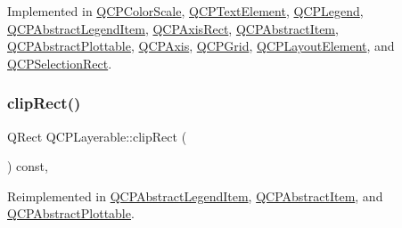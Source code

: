 Implemented in \hyperlink{class_q_c_p_color_scale_af1b24d24a70f25b65d29f09e413390a8}{Q\+C\+P\+Color\+Scale}, \hyperlink{class_q_c_p_text_element_a91f2e4b4a639d9079e89a0030c7ed352}{Q\+C\+P\+Text\+Element}, \hyperlink{class_q_c_p_legend_a817f75c234f82a2e26643dc0de742095}{Q\+C\+P\+Legend}, \hyperlink{class_q_c_p_abstract_legend_item_a6bfbcb9ace779f4f6fe22241c32a67c9}{Q\+C\+P\+Abstract\+Legend\+Item}, \hyperlink{class_q_c_p_axis_rect_a4a318008e2b7f881a14c3d97186b31f9}{Q\+C\+P\+Axis\+Rect}, \hyperlink{class_q_c_p_abstract_item_a5579ce9ec7cad202499886b042448b10}{Q\+C\+P\+Abstract\+Item}, \hyperlink{class_q_c_p_abstract_plottable_ac032077fb0db93d6faa3273d02363398}{Q\+C\+P\+Abstract\+Plottable}, \hyperlink{class_q_c_p_axis_adbaeffcdc2707f2bd5dc1bbd11236770}{Q\+C\+P\+Axis}, \hyperlink{class_q_c_p_grid_a64fa48e16b4629f5df2a5029ab6e761c}{Q\+C\+P\+Grid}, \hyperlink{class_q_c_p_layout_element_a0a8f18141bcf46cf40ad4c13324ff346}{Q\+C\+P\+Layout\+Element}, and \hyperlink{class_q_c_p_selection_rect_aa854697618e16037ba9c73056abfb9bf}{Q\+C\+P\+Selection\+Rect}.

\mbox{\label{class_q_c_p_layerable_acbcfc9ecc75433747b1978a77b1864b3}} 
\subsubsection{\texorpdfstring{clip\+Rect()}{clipRect()}}
{\footnotesize\ttfamily Q\+Rect Q\+C\+P\+Layerable\+::clip\+Rect (\begin{DoxyParamCaption}{ }\end{DoxyParamCaption}) const\hspace{0.3cm}{\ttfamily [protected]}, {\ttfamily [virtual]}}



Reimplemented in \hyperlink{class_q_c_p_abstract_legend_item_a806fa4d0104bdfc141aa8a36fcc9d51c}{Q\+C\+P\+Abstract\+Legend\+Item}, \hyperlink{class_q_c_p_abstract_item_a6ad60000f29afe11035e1f791dcbd45a}{Q\+C\+P\+Abstract\+Item}, and \hyperlink{class_q_c_p_abstract_plottable_a635cee3effc07ad421414c76fd83548c}{Q\+C\+P\+Abstract\+Plottable}.

\mbox{\label{class_q_c_p_layerable_ae546370644a5551c76af739afc008bee}} 
